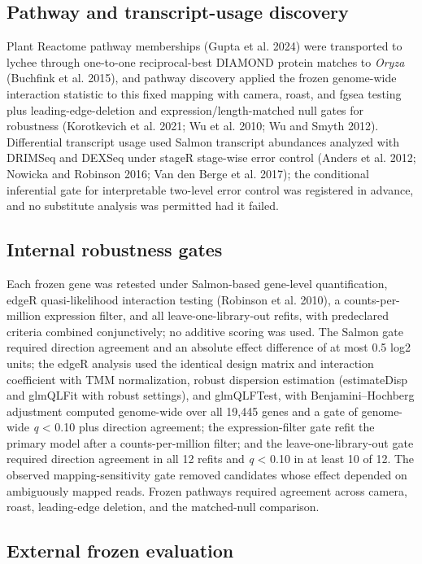 \documentclass[12pt,letterpaper]{article}
\begin{document}
\subsection*{Pathway and transcript-usage discovery}

Plant Reactome pathway memberships (Gupta et al. 2024) were transported to lychee through one-to-one reciprocal-best DIAMOND protein matches to \textit{Oryza} (Buchfink et al. 2015), and pathway discovery applied the frozen genome-wide interaction statistic to this fixed mapping with camera, roast, and fgsea testing plus leading-edge-deletion and expression/length-matched null gates for robustness (Korotkevich et al. 2021; Wu et al. 2010; Wu and Smyth 2012). Differential transcript usage used Salmon transcript abundances analyzed with DRIMSeq and DEXSeq under stageR stage-wise error control (Anders et al. 2012; Nowicka and Robinson 2016; Van den Berge et al. 2017); the conditional inferential gate for interpretable two-level error control was registered in advance, and no substitute analysis was permitted had it failed.

\subsection*{Internal robustness gates}

Each frozen gene was retested under Salmon-based gene-level quantification, edgeR quasi-likelihood interaction testing (Robinson et al. 2010), a counts-per-million expression filter, and all leave-one-library-out refits, with predeclared criteria combined conjunctively; no additive scoring was used. The Salmon gate required direction agreement and an absolute effect difference of at most 0.5 log2 units; the edgeR analysis used the identical design matrix and interaction coefficient with TMM normalization, robust dispersion estimation (estimateDisp and glmQLFit with robust settings), and glmQLFTest, with Benjamini–Hochberg adjustment computed genome-wide over all 19,445 genes and a gate of genome-wide \textit{q} < 0.10 plus direction agreement; the expression-filter gate refit the primary model after a counts-per-million filter; and the leave-one-library-out gate required direction agreement in all 12 refits and \textit{q} < 0.10 in at least 10 of 12. The observed mapping-sensitivity gate removed candidates whose effect depended on ambiguously mapped reads. Frozen pathways required agreement across camera, roast, leading-edge deletion, and the matched-null comparison.

\subsection*{External frozen evaluation}
\end{document}
